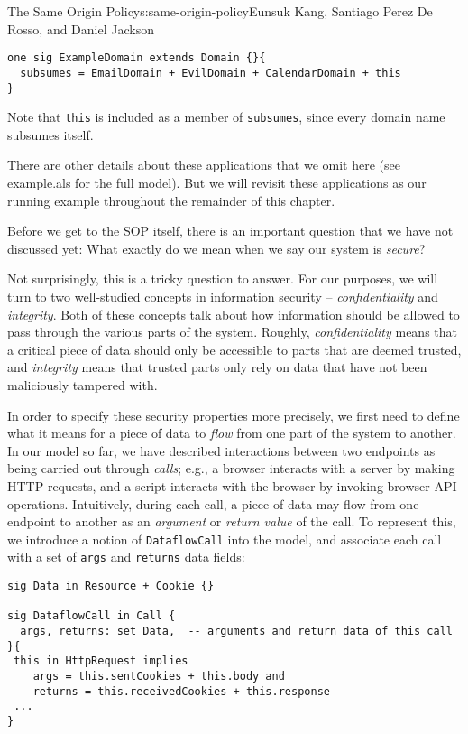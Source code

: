 \begin{aosachapter}{The Same Origin Policy}{s:same-origin-policy}{Eunsuk Kang, Santiago Perez De Rosso, and Daniel Jackson}
\begin{verbatim}
one sig ExampleDomain extends Domain {}{
  subsumes = EmailDomain + EvilDomain + CalendarDomain + this
}   
\end{verbatim}

Note that \texttt{this} is included as a member of \texttt{subsumes},
since every domain name subsumes itself.

There are other details about these applications that we omit here (see
example.als for the full model). But we will revisit these applications
as our running example throughout the remainder of this chapter.

\label{security-properties}

Before we get to the SOP itself, there is an important question that we
have not discussed yet: What exactly do we mean when we say our system
is \emph{secure}?

Not surprisingly, this is a tricky question to answer. For our purposes,
we will turn to two well-studied concepts in information security --
\emph{confidentiality} and \emph{integrity}. Both of these concepts talk
about how information should be allowed to pass through the various
parts of the system. Roughly, \emph{confidentiality} means that a
critical piece of data should only be accessible to parts that are
deemed trusted, and \emph{integrity} means that trusted parts only rely
on data that have not been maliciously tampered with.

\label{dataflow-properties}

In order to specify these security properties more precisely, we first
need to define what it means for a piece of data to \emph{flow} from one
part of the system to another. In our model so far, we have described
interactions between two endpoints as being carried out through
\emph{calls}; e.g., a browser interacts with a server by making HTTP
requests, and a script interacts with the browser by invoking browser
API operations. Intuitively, during each call, a piece of data may flow
from one endpoint to another as an \emph{argument} or \emph{return
value} of the call. To represent this, we introduce a notion of
\texttt{DataflowCall} into the model, and associate each call with a set
of \texttt{args} and \texttt{returns} data fields:

\begin{verbatim}
sig Data in Resource + Cookie {}

sig DataflowCall in Call {
  args, returns: set Data,  -- arguments and return data of this call
}{
 this in HttpRequest implies
    args = this.sentCookies + this.body and
    returns = this.receivedCookies + this.response
 ...
}
\end{verbatim}


\end{aosachapter}
